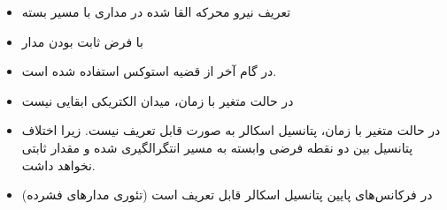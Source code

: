 \begin{ELunit}

\begin{itemize}
\tightlist
\item
  تعریف نیرو محرکه القا شده در مداری با مسیر بسته 
\end{itemize}


\begin{itemize}
\tightlist
\item
  با فرض ثابت بودن مدار
\end{itemize}


\end{ELunit}

\begin{ELjoin}

\begin{itemize}
\tightlist
\item
  در گام آخر از قضیه استوکس استفاده شده است.
\end{itemize}

\begin{ELimportant}{}


\end{ELimportant}

\end{ELjoin}

\begin{ELunit}

\begin{itemize}
\tightlist
\item
  در حالت متغیر با زمان، میدان الکتریکی ابقایی نیست \ELim{\ELto} 
\item
  در حالت متغیر با زمان، پتانسیل اسکالر به صورت  قابل تعریف نیست. زیرا اختلاف پتانسیل بین دو نقطه فرضی وابسته به مسیر انتگرالگیری شده و مقدار ثابتی نخواهد داشت.
\item
  در فرکانس‌های پایین \ELim{\ELto}  \ELim{\ELto} پتانسیل اسکالر قابل تعریف است (تئوری مدارهای فشرده)
\end{itemize}

\end{ELunit}

